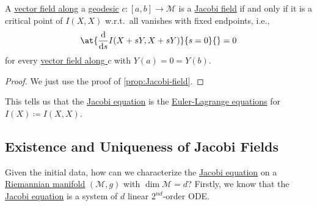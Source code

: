 \begin{lemma}
	A \hyperref[def:vector-field-along-curve]{vector field along} a \hyperref[def:geodesic]{geodesic} \(c \colon [a, b] \to \mathcal{M} \) is a \hyperref[def:Jacobi-field]{Jacobi field} if and only if it is a critical point of \(I(X, X)\) w.r.t.\ all vanishes with fixed endpoints, i.e.,
	\[
		\at{\frac{\mathrm{d}}{\mathrm{d}s} I(X + s Y, X + sY)}{s=0}{} = 0
	\]
	for every \hyperref[def:vector-field-along-curve]{vector field along \(c\)} with \(Y(a) = 0 = Y(b)\).
\end{lemma}
\begin{proof}
	We just use the proof of \autoref{prop:Jacobi-field}.
\end{proof}

This tells us that the \hyperref[eq:Jacobi]{Jacobi equation} is the \href{https://en.wikipedia.org/wiki/Euler%E2%80%93Lagrange_equation}{Euler-Lagrange equations} for \(I(X) \coloneqq I(X, X)\).

\subsection{Existence and Uniqueness of Jacobi Fields}
Given the initial data, how can we characterize the \hyperref[eq:Jacobi]{Jacobi equation} on a \hyperref[def:Riemannian-manifold]{Riemannian manifold} \((\mathcal{M} , g)\) with \(\dim \mathcal{M} = d\)? Firstly, we know that the \hyperref[eq:Jacobi]{Jacobi equation} is a system of \(d\) linear \(2^{nd} \)-order ODE.

